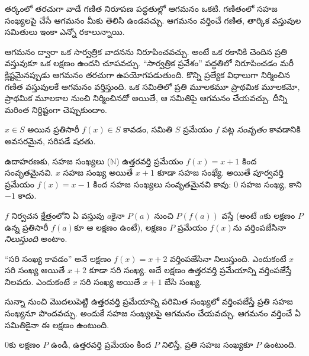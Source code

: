 \documentclass[../../../include/open-logic-section]{subfiles}
\begin{document}


\begin{explain}
తర్కంలో తరచుగా వాడే గణిత నిరూపణ పద్ధతుల్లో ఆగమనం ఒకటి. గణితంలో సహజ సంఖ్యలపై చేసే ఆగమనం మీకు తెలిసి ఉండవచ్చు. ఆగమనం వర్తించే గణిత, తార్కిక వస్తువుల సమితులు ఇంకా ఎన్నో రకాలున్నాయి.

ఆగమనం ద్వారా ఒక సార్వత్రిక వాదనను నిరూపించవచ్చు. అంటే ఒక రకానికి చెందిన ప్రతి వస్తువుకూ ఒక లక్షణం ఉందని చూపవచ్చు. “సార్వత్రిక ప్రవేశం” పద్ధతిలో నిరూపించడం మరీ క్లిష్టమైనప్పుడు ఆగమనం తరచుగా ఉపయోగపడుతుంది. కొన్ని ప్రత్యేక విధాలుగా నిర్మించిన గణిత వస్తువులకే ఆగమనం వర్తిస్తుంది. ఒక సమితిలో ప్రతి మూలకమూ ప్రాథమిక మూలకమో, ప్రాథమిక మూలకాల నుంచి నిర్మించినదో అయితే, ఆ సమితిపై ఆగమనం చేయవచ్చు. దీన్ని మరింత నిర్దిష్టంగా చెప్పుకుందాం.
\end{explain}

\begin{defn}
$x \in S$ అయిన ప్రతిసారీ $f(x) \in S$ కావడం, సమితి $S$ ప్రమేయం $f$ పట్ల \emph{సంవృతం} కావడానికి అవసరమైన, సరిపడే షరతు.
\end{defn}

\begin{explain}
ఉదాహరణకు, సహజ సంఖ్యలు ($\mathbb{N}$) ఉత్తరవర్తి ప్రమేయం $f(x) = x+1$ కింద సంవృతమైనవి. $x$ సహజ సంఖ్య అయితే $x+1$ కూడా సహజ సంఖ్యే. అయితే పూర్వవర్తి ప్రమేయం $f(x) = x-1$ కింద సహజ సంఖ్యలు సంవృతమైనవి కావు: $0$ సహజ సంఖ్య, కాని $-1$ కాదు.
\end{explain}

\begin{defn}
$f$ నిర్వచన క్షేత్రంలోని ఏ వస్తువు $a$కైనా $P(a)$ నుంచి $P(f(a))$ వస్తే (అంటే $a$కు లక్షణం $P$ ఉన్న ప్రతిసారీ $f(a)$కూ ఆ లక్షణం ఉంటే), లక్షణం $P$ ప్రమేయం $f(x)$ను వర్తింపజేసినా \emph{నిలుస్తుంది} అంటాం.
\end{defn}

\begin{explain}
“సరి సంఖ్య కావడం” అనే లక్షణం $f(x) = x+2$ వర్తింపజేసినా నిలుస్తుంది. ఎందుకంటే $x$ సరి సంఖ్య అయితే $x+2$ కూడా సరి సంఖ్య. అదే లక్షణం ఉత్తరవర్తి ప్రమేయాన్ని వర్తింపజేస్తే నిలవదు. ఎందుకంటే $x$ సరి సంఖ్య అయితే $x+1$ బేసి సంఖ్య.

సున్నా నుంచి మొదలుపెట్టి ఉత్తరవర్తి ప్రమేయాన్ని పరిమిత సంఖ్యలో వర్తింపజేస్తే ప్రతి సహజ సంఖ్యనూ పొందవచ్చు. అందుకే సహజ సంఖ్యలపై ఆగమనం చేయవచ్చు. ఆగమనం వర్తించే ఏ సమితికైనా ఈ లక్షణం ఉంటుంది.
\end{explain}

\begin{defn}
0కు లక్షణం $P$ ఉండి, ఉత్తరవర్తి ప్రమేయం కింద $P$ నిలిస్తే, ప్రతి సహజ సంఖ్యకూ $P$ ఉంటుంది.
\end{defn}
\end{document}
